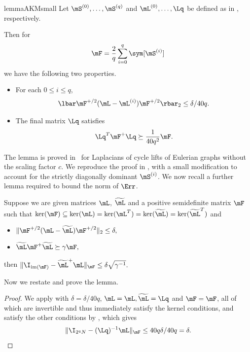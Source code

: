 \documentclass{toc}
\begin{document}
%
\begin{restatable}{lemma}{AKMsmall}
\label{lem:cycleCore}
  Let $\mS^{(0)},\dots,\mS^{(q)}$ and $\mL^{(0)},\dots,\Lq$ be defined as in 
 , respectively. %
%

Then for 
$$\mF = \frac{2}{q}\sum_{i=0}^q\sym[\mS^{(i)}]$$
we have the following %
two properties. %
\begin{itemize}
    \item For each $0\leq i \leq q$,
    $$\lbar \mF^{+/2}(\mL-\mL^{(i)})\mF^{+/2}\rbar_2 \leq \delta/40q .$$ %
    
    \item The final matrix $\Lq$ satisfies 
    $${\Lq}^T \mF^{+}\Lq \succeq \frac{1}{40q^2}\mF.$$
\end{itemize}
\end{restatable}
The lemma is proved in~\cite{AhmadinejadKeMuPeSiVa19} for Laplacians of cycle lifts of Eulerian graphs without the scaling factor $c$. We reproduce the proof in , with a small modification to account for the strictly diagonally dominant
%
$\mS^{(i)}$.  %
We now recall a further lemma required to bound the norm of $\Err$.
%
\begin{lemma}\label{lem:D4}  %
Suppose we are given matrices $\mL$, $\widetilde{\mL}$ and a positive
%
semidefinite  %
matrix $\mF$ such that $\ker(\mF) \subseteq \ker(\mL) = \ker(\mL^T) = \ker(\widetilde{\mL}) = \ker(\widetilde{\mL}^T)$ and
\begin{itemize}
    \item $\|\mF^{+/2}(\mL-\widetilde{\mL})\mF^{+/2}\|_2\leq \delta,$
    \item $\widetilde{\mL}\mF^+\widetilde{\mL}\succeq \gamma \mF,$
\end{itemize}
then $\|\I_{\text{im}(\mF)}-\widetilde{\mL}^+\mL\|_\mF \leq \delta \sqrt{\gamma^{-1}}.$
\end{lemma}
%
Now we restate and prove the lemma.  %
\goodF*
\begin{proof}
  We apply  with $\delta=\delta/40q$, $\mL=\mL,\widetilde{\mL}=\Lq$ and $\mF=\mF$, all of which are invertible and thus immediately satisfy the kernel
%
conditions, %
and satisfy the other %
conditions  %
by , which gives
\[\|\I_{2^qN}-(\Lq)^{-1}\mL\|_\mF\leq 40q\delta/40q= \delta. \]
\end{proof}
\end{document}
